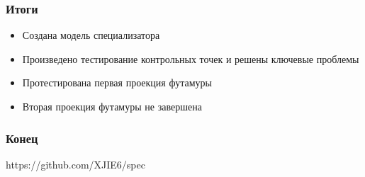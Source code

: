 \documentclass[demo]{beamer}
\begin{document}
\begin{frame}[fragile]
\begin{columns}
\begin{column}{0.3\textwidth}
\begin{lstlisting}
\end{lstlisting}
\end{column}
\end{columns}
\end{frame}

\begin{frame}\frametitle{Итоги}
\begin{itemize}
\item Создана модель специализатора
\vfill
\item Произведено тестирование контрольных точек и решены ключевые проблемы
\vfill
\item Протестирована первая проекция футамуры
\vfill
\item Вторая проекция футамуры не завершена
\end{itemize}
\end{frame}

\begin{frame}\frametitle{Конец}
https://github.com/XJIE6/spec
\end{frame}
\end{document}
